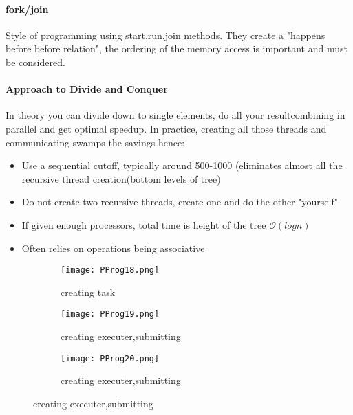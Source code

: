 \documentclass[8pt]{extreport}
\begin{document}
\paragraph{fork/join} Style of programming using start,run,join methods. They create a "happens before before relation", the ordering of the memory access is important and must be considered.
\paragraph{Approach to Divide and Conquer} In theory you can divide down to single elements, do all your resultcombining in parallel and get optimal speedup. In practice, creating all those threads and communicating swamps the savings hence:
\begin{itemize}
\item Use a sequential cutoff, typically around 500-1000 (eliminates almost all the recursive thread creation(bottom levels of tree)
\item Do not create two recursive threads, create one and do the other "yourself"
\item If given enough processors, total time is height of the tree $\mathcal{O}(logn)$ 
\item Often relies on operations being associative
\end{itemize}
\begin{figure}[h!]
	\centering
	\begin{subfigure}[b]{0.49\linewidth}
	\texttt{[image: PProg18.png]}
	\caption{creating task}
	\label{PProg18}
	\end{subfigure}
	\begin{subfigure}[b]{0.49\linewidth}
	\texttt{[image: PProg19.png]}
	\caption{creating executer,submitting}
	\label{PProg19}
	\end{subfigure}
	\begin{subfigure}[b]{0.99\linewidth}
	\texttt{[image: PProg20.png]}
	\caption{creating executer,submitting}
	\label{PProg19}
	\end{subfigure}
\end{figure}
\end{document}
